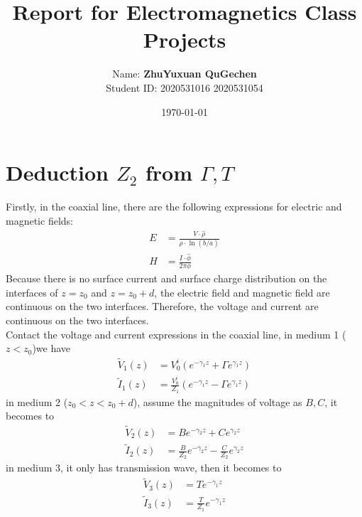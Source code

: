 \documentclass{article}
\title{
    \vspace{2in}
    \textmd{\textbf{Report for Electromagnetics Class Projects}}\\
    \vspace{2in}
}
\author{
	Name: \textbf{ZhuYuxuan QuGechen} \\
	Student ID: 2020531016 2020531054}
\date{\today}
\begin{document}
\maketitle
\pagebreak

\section{Deduction $Z_2$ from $\Gamma,T$}

Firstly, in the coaxial line, there are the following expressions for electric and magnetic fields:
\begin{align*}
    E &=\frac{V\cdot \hat{\rho } }{\rho \cdot \ln(b/a)}\\
    H &=\frac{I\cdot \hat{\phi} }{2\pi\phi}
\end{align*}
Because there is no surface current and surface charge distribution on the interfaces of $z=z_0$ and $z=z_0+d$,
the electric field and magnetic field are continuous on the two interfaces.
Therefore, the voltage and current are continuous on the two interfaces.\\

Contact the voltage and current expressions in the coaxial line, in medium 1 ($z<z_0$)we have
\begin{align*}
    \tilde{V}_1(z) & = V_0^i(e^{-\gamma_1z}+\Gamma e^{\gamma_1z})\\
    \tilde{I}_1(z) & = \frac{V_0^i}{Z_1}(e^{-\gamma_1z}-\Gamma e^{\gamma_1z})
\end{align*}
in medium 2 ($z_0<z<z_0+d$), assume the magnitudes of voltage as $B,C$, it becomes to
\begin{align*}
    \tilde{V}_2(z) & = Be^{-\gamma_2z}+C e^{\gamma_2z}\\
    \tilde{I}_2(z) & = \frac{B}{Z_2}e^{-\gamma_2z}-\frac{C}{Z_2} e^{\gamma_2z}
\end{align*}
in medium 3, it only has transmission wave, then it becomes to
\begin{align*}
    \tilde{V}_3(z) & = Te^{-\gamma_1z}\\
    \tilde{I}_3(z) & = \frac{T}{Z_1}e^{-\gamma_1z}
\end{align*}
\end{document}
